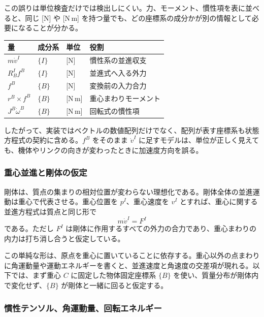 この誤りは単位検査だけでは検出しにくい。力、モーメント、慣性項を表に並べると、同じ [N] や [N\,m] を持つ量でも、どの座標系の成分かが別の情報として必要になることが分かる。
\begin{center}
\begin{tabular}{llll}
\hline
量 & 成分系 & 単位 & 役割\\
\hline
$m\dot{v}^I$ & $\{I\}$ & [N] & 慣性系の並進収支\\
$R^I_B f^B$ & $\{I\}$ & [N] & 並進式へ入る外力\\
$f^B$ & $\{B\}$ & [N] & 変換前の入力合力\\
$r^B\times f^B$ & $\{B\}$ & [N\,m] & 重心まわりモーメント\\
$J^B\dot{\omega}^B$ & $\{B\}$ & [N\,m] & 回転式の慣性項\\
\hline
\end{tabular}
\end{center}
したがって、実装ではベクトルの数値配列だけでなく、配列が表す座標系も状態方程式の契約に含める。$f^B$ をそのまま $\dot{v}^I$ に足すモデルは、単位が正しく見えても、機体やリンクの向きが変わったときに加速度方向を誤る。

\subsubsection{重心並進と剛体の仮定}

剛体は、質点の集まりの相対位置が変わらない理想化である。剛体全体の並進運動は重心で代表させる。重心位置を $p^I$、重心速度を $v^I$ とすれば、重心に関する並進方程式は質点と同じ形で
\begin{equation}
  m\dot{v}^I=F^I
\end{equation}
である。ただし $F^I$ は剛体に作用するすべての外力の合力であり、重心まわりの内力は打ち消し合うと仮定している。

この単純な形は、原点を重心に置いていることに依存する。重心以外の点まわりに角運動量や運動エネルギーを書くと、並進速度と角速度の交差項が現れる。以下では、まず重心 $C$ に固定した物体固定座標系 $\{B\}$ を使い、質量分布が剛体内で変化せず、$\{B\}$ が剛体と一緒に回ると仮定する。

\subsubsection{慣性テンソル、角運動量、回転エネルギー}


